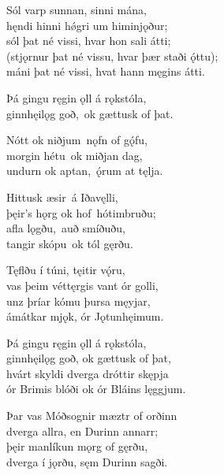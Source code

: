 \bva Sól varp sunnan, \hld sinni mána,\footnotemark[10] \\
hęndi hinni hǿgri \hld um himinjǫður; \\
sól þat né vissi, \hld hvar hon sali átti; \\
(stjǫrnur þat né vissu, \hld hvar þær staði ǫ́ttu); \\
máni þat né vissi, \hld hvat hann męgins átti.

\bva Þá gingu ręgin ǫll \hld á rǫkstóla, \\
ginnhęilǫg goð, \hld ok gættusk of þat.\footnotemark[20] \\

\bva Nótt ok niðjum \hld nǫfn of gǫ́fu, \\
morgin hétu \hld ok miðjan dag, \\
undurn ok aptan, \hld ǫ́rum at tęlja.\footnotemark[22]

\bva Hittusk æsir \hld á Iðavęlli, \\
þęir's hǫrg ok hof \hld hótimbruðu; \\
afla lǫgðu, \hld auð smíðuðu, \\
tangir skópu \hld ok tól gęrðu.

\bva Tęflðu í túni, \hld tęitir vǫ́ru, \\
vas þeim véttęrgis \hld vant ór golli, \\
unz þríar kómu \hld þursa męyjar, \\
ámátkar mjǫk, \hld ór Jǫtunhęimum.\footnotemark[21]

\bva Þá gingu ręgin ǫll \hld á rǫkstóla, \\
ginnhęilǫg goð, \hld ok gættusk of þat, \\
hvárt skyldi dverga \hld dróttir skępja \\
ór Brimis blóði \hld ok ór Bláins lęggjum.\footnotemark[22]

\bva Þar vas Móðsognir \hld mæztr of orðinn \\
dverga allra, \hld en Durinn annarr; \\
þęir manlíkun \hld mǫrg of gęrðu, \\
dverga í jǫrðu, \hld sęm Durinn sagði.

